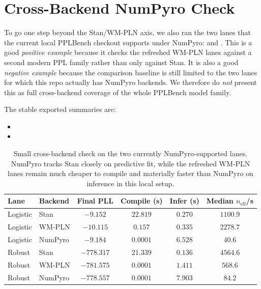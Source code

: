 \documentclass[11pt,openany]{report}
\begin{document}
\section{Cross-Backend NumPyro Check}
\label{app:pplbench-numpyro-crosscheck}

To go one step beyond the Stan/WM-PLN axis, we also ran the two lanes that the
current local PPLBench checkout supports under NumPyro:
 and .  This is a
good \emph{positive example} because it checks the refreshed WM-PLN lanes
against a second modern PPL family rather than only against Stan.  It is also a
good \emph{negative example} because the comparison baseline is still limited to
the two lanes for which this repo actually has NumPyro backends.  We therefore
do \emph{not} present this as full cross-backend coverage of the whole
PPLBench model family.

The stable exported summaries are:
\begin{itemize}
\item {}
\item {}
\end{itemize}

\begin{table}[htbp]
\centering
\caption{Small cross-backend check on the two currently NumPyro-supported
lanes.  NumPyro tracks Stan closely on predictive fit, while the refreshed
WM-PLN lanes remain much cheaper to compile and materially faster than NumPyro
on inference in this local setup.}
\label{tab:pplbench-numpyro-crosscheck}
\small
\begin{tabular}{llcccc}
\toprule
Lane & Backend & Final PLL & Compile (s) & Infer (s) & Median $n_{\mathrm{eff}}$/s \\
\midrule
Logistic & Stan & $-9.152$ & $22.819$ & $0.270$ & $1100.9$ \\
Logistic & WM-PLN & $-10.115$ & $0.157$ & $0.335$ & $2278.7$ \\
Logistic & NumPyro & $-9.184$ & $0.0001$ & $6.528$ & $40.6$ \\
\midrule
Robust & Stan & $-778.317$ & $21.339$ & $0.136$ & $4564.6$ \\
Robust & WM-PLN & $-781.575$ & $0.0001$ & $1.411$ & $568.6$ \\
Robust & NumPyro & $-778.557$ & $0.0001$ & $7.903$ & $84.2$ \\
\bottomrule
\end{tabular}
\end{table}
\end{document}
